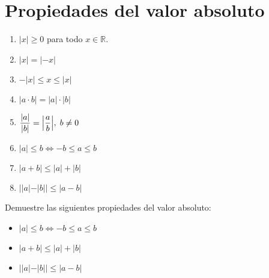 
\newpage

\section{Propiedades del valor absoluto}
\vspace{0.3cm}
\begin{multicols}{2}
\begin{enumerate}[parsep =6pt, itemsep = 15pt]
    \item $|x| \geq 0$ para todo $x \in \mathbb{R}$.
    \item $|x| = |-x|$
    \item $-|x| \leq x \leq |x|$
    \item $|a\cdot b| =  |a|\cdot|b|$
    \item $\mathlarger{\frac{|a|}{|b|} = \left|\frac{a}{b}\right|}, \hspace{0.1cm} b \neq 0$
    \item $|a| \leq b \Leftrightarrow -b \leq a \leq b$
    \item $|a+b| \leq |a| + |b|$
    \item $||a|-|b|| \leq |a-b|$
\end{enumerate}
\end{multicols}

\begin{Problemas}{}{}
Demuestre las siguientes propiedades del valor absoluto:
\begin{itemize}[parsep =6pt, itemsep = 15pt]
    \item $|a| \leq b \Leftrightarrow -b \leq a \leq b$
    \item $|a+b| \leq |a| + |b|$
    \item $||a|-|b|| \leq |a-b|$
\end{itemize}
\end{Problemas}

